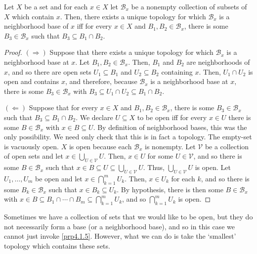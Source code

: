 \begin{prp}\label{prp4.1.8}
Let $X$ be a set and for each $x\in X$ let $\mathcal{B}_x$ be a nonempty collection of subsets of $X$ which contain $x$.  Then, there exists a unique topology for which $\mathcal{B}_x$ is a neighborhood base of $x$ iff for every $x\in X$ and $B_1,B_2\in \mathcal{B}_x$, there is some $B_3\in \mathcal{B}_x$ such that $B_3\subseteq B_1\cap B_2$.
\begin{proof}
$(\Rightarrow )$ Suppose that there exists a unique topology for which $\mathcal{B}_x$ is a neighborhood base at $x$.  Let $B_1,B_2\in \mathcal{B}_x$.  Then, $B_1$ and $B_2$ are neighborhoods of $x$, and so there are open sets $U_1\subseteq B_1$ and $U_2\subseteq B_2$ containing $x$.  Then, $U_1\cap U_2$ is open and contains $x$, and therefore, because $\mathcal{B}_x$ is a neighborhood base at $x$, there is some $B_3\in \mathcal{B}_x$ with $B_3\subseteq U_1\cap U_2\subseteq B_1\cap B_2$.

\blankline
\noindent
$(\Leftarrow )$ Suppose that for every $x\in X$ and $B_1,B_2\in \mathcal{B}_x$, there is some $B_3\in \mathcal{B}_x$ such that $B_3\subseteq B_1\cap B_2$.  We declare $U\subseteq X$ to be open iff for every $x\in U$ there is some $B\in \mathcal{B}_x$ with $x\in B\subseteq U$.  By definition of neighborhood bases, this was the only possibility.  We need only check that this is in fact a topology.  The empty-set is vacuously open.  $X$ is open because each $\mathcal{B}_x$ is nonempty.  Let $\mathcal{V}$ be a collection of open sets and let $x\in \bigcup _{U\in \mathcal{V}}U$.  Then, $x\in U$ for some $U\in \mathcal{V}$, and so there is some $B\in \mathcal{B}_x$ such that $x\in B\subseteq U\subseteq \bigcup _{U\in \mathcal{V}}U$.  Thus, $\bigcup _{U\in \mathcal{V}}U$ is open.  Let $U_1,\ldots ,U_m$ be open and let $x\in \bigcap _{k=1}^mU_k$.  Then, $x\in U_k$ for each $k$, and so there is some $B_k\in \mathcal{B}_x$ such that $x\in B_k\subseteq U_k$.  By hypothesis, there is then some $B\in \mathcal{B}_x$ with $x\in B\subseteq B_1\cap \cdots \cap B_m\subseteq \bigcap _{k=1}^mU_k$, and so $\bigcap _{k=1}^mU_k$ is open.
\end{proof}
\end{prp}
Sometimes we have a collection of sets that we would like to be open, but they do not necessarily form a base (or a neighborhood base), and so in this case we cannot just invoke \cref{prp4.1.5}.  However, what we can do is take the `smallest' topology which contains these sets.
